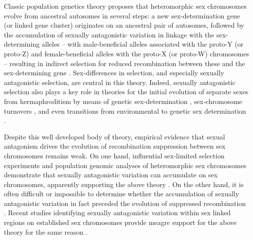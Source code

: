 \documentclass{article}
\begin{document}
Classic population genetics theory proposes that heteromorphic sex chromosomes evolve from ancestral autosomes in several steps: a new sex-determination gene (or linked gene cluster) originates on an ancestral pair of autosomes, followed by the accumulation of sexually antagonistic variation in linkage with the sex-determining alleles -- with male-beneficial alleles associated with the proto-Y (or proto-Z) and female-beneficial alleles with the proto-X (or proto-W) chromosomes -- resulting in indirect selection for reduced recombination between these and the sex-determining gene \citep{Fisher1931, Nei1969, Charlesworth1980, Bull1983, Rice1987, Lenormand2003, CharlesworthMarais2005}. Sex-differences in selection, and especially sexually antagonistic selection, are central in this theory. Indeed, sexually antagonistic selection also plays a key role in theories for the initial evolution of separate sexes from hermaphroditism by means of genetic sex-determination \citep{Charlesworth1978a, Charlesworth1978b, Bull1983, Olito2019}, sex-chromosome turnovers \citep{vanDoornKirkpatrick2007,vanDoornKirkpatrick2010,OttoScottOsmond2018}, and even transitions from environmental to genetic sex determination \citep{MuralidharVeller2018}. 

Despite this well developed body of theory, empirical evidence that sexual antagonism drives the evolution of recombination suppression between sex chromosomes remains weak. On one hand, influential sex-limited selection experiments and population genomic analyses of heteromorphic sex chromosomes demonstrate that sexually antagonistic variation can accumulate on sex chromosomes, apparently supporting the above theory \cite[e.g.,][]{Rice1992,Chippindale2001,Gibson2002, ZhouBachtrog2012,QiuBergeroCharlesworth2013}. On the other hand, it is often difficult or impossible to determine whether the accumulation of sexually antagonistic variation in fact preceded the evolution of suppressed recombination \citep{Charlesworth1980, Rice1984, Ironside2010, Ponnikas2018}. Recent studies identifying sexually antagonistic variation within sex linked regions on established sex chromosomes provide meagre support for the above theory for the same reason \cite[e.g.][]{BergeroCharlesworth2009,QiuBergeroCharlesworth2013,KirkpatrickGuerrero2014, Wright2017, BergeroCharlesworth2019}.
\end{document}
